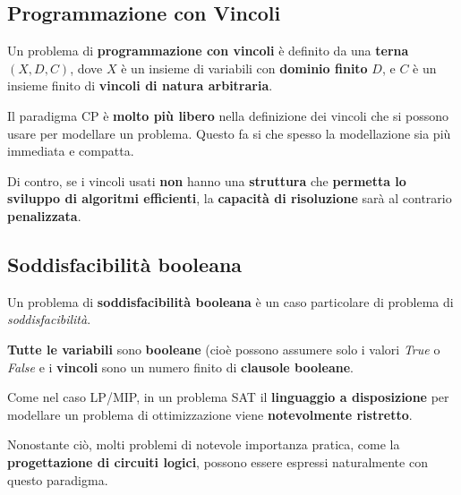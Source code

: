 \subsection{Programmazione con Vincoli}

Un problema di \textbf{programmazione con vincoli} è definito da una \textbf{terna} 
$(X, D, C)$, dove $X$ è un insieme di variabili con \textbf{dominio finito} $D$, 
e $C$ è un insieme finito di \textbf{vincoli di natura arbitraria}.

\begin{remark}
    Il paradigma CP è \textbf{molto più libero} nella definizione dei vincoli 
    che si possono usare per modellare un problema. 
    Questo fa si che spesso la modellazione sia più immediata e compatta.

    Di contro, se i vincoli usati \textbf{non} hanno una \textbf{struttura} che 
    \textbf{permetta lo sviluppo di algoritmi efficienti}, la \textbf{capacità di 
    risoluzione} sarà al contrario \textbf{penalizzata}.
\end{remark}

\subsection{Soddisfacibilità booleana}

Un problema di \textbf{soddisfacibilità booleana} è un caso particolare di problema
di \textit{soddisfacibilità}.

\begin{definition}
    \textbf{Tutte le variabili} sono \textbf{booleane} (cioè possono assumere solo i 
    valori \textit{True} o \textit{False} e i \textbf{vincoli} sono un numero 
    finito di \textbf{clausole booleane}.
\end{definition}

Come nel caso LP/MIP, in un problema SAT il \textbf{linguaggio a disposizione} per modellare un
problema di ottimizzazione viene \textbf{notevolmente ristretto}.

\begin{remark}
    Nonostante ciò, molti problemi di notevole importanza pratica, come la 
    \textbf{progettazione di circuiti logici}, possono essere espressi naturalmente 
    con questo paradigma.
\end{remark}
